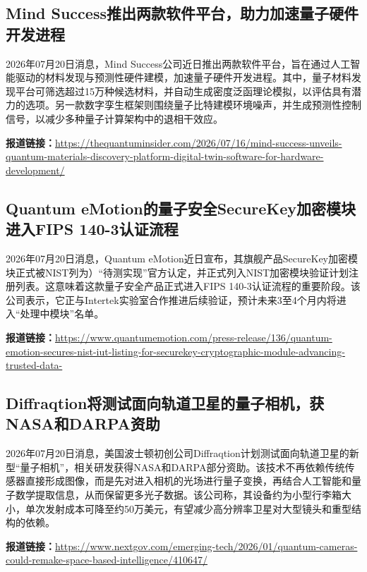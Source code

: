 \documentclass[12pt,a4paper]{ctexart}
\begin{document}
\subsection{ Mind Success推出两款软件平台，助力加速量子硬件开发进程 }

2026年07月20日消息，Mind Success公司近日推出两款软件平台，旨在通过人工智能驱动的材料发现与预测性硬件建模，加速量子硬件开发进程。其中，量子材料发现平台可筛选超过15万种候选材料，并自动生成密度泛函理论模拟，以评估具有潜力的选项。另一款数字孪生框架则围绕量子比特建模环境噪声，并生成预测性控制信号，以减少多种量子计算架构中的退相干效应。

\noindent\textbf{报道链接：}\url{https://thequantuminsider.com/2026/07/16/mind-success-unveils-quantum-materials-discovery-platform-digital-twin-software-for-hardware-development/}

\subsection{ Quantum eMotion的量子安全SecureKey加密模块进入FIPS 140-3认证流程 }

2026年07月20日消息，Quantum eMotion近日宣布，其旗舰产品SecureKey加密模块正式被NIST列为）“待测实现”官方认定，并正式列入NIST加密模块验证计划注册列表。这意味着这款量子安全产品正式进入FIPS 140-3认证流程的重要阶段。该公司表示，它正与Intertek实验室合作推进后续验证，预计未来3至4个月内将进入“处理中模块”名单。

\noindent\textbf{报道链接：}\url{https://www.quantumemotion.com/press-release/136/quantum-emotion-secures-nist-iut-listing-for-securekey-cryptographic-module-advancing-trusted-data-}

\subsection{ Diffraqtion将测试面向轨道卫星的量子相机，获NASA和DARPA资助 }

2026年07月20日消息，美国波士顿初创公司Diffraqtion计划测试面向轨道卫星的新型“量子相机”，相关研发获得NASA和DARPA部分资助。该技术不再依赖传统传感器直接形成图像，而是先对进入相机的光场进行量子变换，再结合人工智能和量子数学提取信息，从而保留更多光子数据。该公司称，其设备约为小型行李箱大小，单次发射成本可降至约50万美元，有望减少高分辨率卫星对大型镜头和重型结构的依赖。

\noindent\textbf{报道链接：}\url{https://www.nextgov.com/emerging-tech/2026/01/quantum-cameras-could-remake-space-based-intelligence/410647/}
\end{document}
